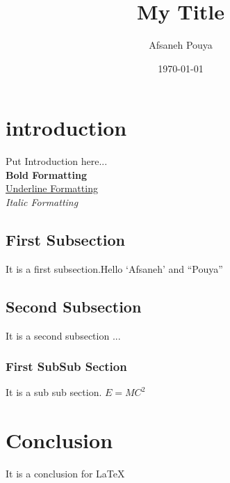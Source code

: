 \documentclass{article}
\title{My Title}
\author{Afsaneh Pouya}
\date{\today}
\begin{document}
\maketitle

\section{introduction}
Put Introduction here... \\
\textbf{Bold Formatting} \\
\underline{Underline Formatting} \\
\emph{Italic Formatting}

\subsection{First Subsection}
It is a first subsection.Hello `Afsaneh' and ``Pouya''

\subsection{Second Subsection}
It is a second subsection ...

\subsubsection{First SubSub Section}
It is a sub sub section. $E=MC^2$

\section{Conclusion}
It is a conclusion for \LaTeX
\end{document}

